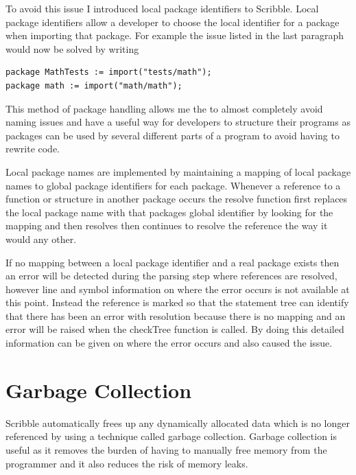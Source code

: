 \documentclass[]{final_report}
\begin{document}
To avoid this issue I introduced local package identifiers to Scribble. Local package identifiers allow a developer to choose the local identifier for a package when importing that package. For example the issue listed in the last paragraph would now be solved by writing
\begin{verbatim}
package MathTests := import("tests/math");
package math := import("math/math");
\end{verbatim}

This method of package handling allows me the to almost completely avoid naming issues and have a useful way for developers to structure their programs as packages can be used by several different parts of a program to avoid having to rewrite code.

Local package names are implemented by maintaining a mapping of local package names to global package identifiers for each package. Whenever a reference to a function or structure in another package occurs the resolve function first replaces the local package name with that packages global identifier by looking for the mapping and then resolves then continues to resolve the reference the way it would any other. 

If no mapping between a local package identifier and a real package exists then an error will be detected during the parsing step where references are resolved, however line and symbol information on where the error occurs is not available at this point. Instead the reference is marked so that the statement tree can identify that there has been an error with resolution because there is no mapping and an error will be raised when the checkTree function is called. By doing this detailed information can be given on where the error occurs and also caused the issue.

\chapter{Garbage Collection}

Scribble automatically frees up any dynamically allocated data which is no longer referenced by using a technique called garbage collection. Garbage collection is useful as it removes the burden of having to manually free memory from the programmer and it also reduces the risk of memory leaks. 
\end{document}
